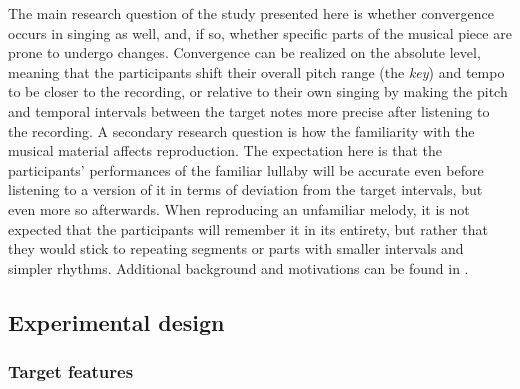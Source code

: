 The main research question of the study presented here is whether convergence occurs in singing as well, and, if so, whether specific parts of the musical piece are prone to undergo changes.
Convergence can be realized on the absolute level, meaning that the participants shift their overall pitch range (the \emph{key}) and tempo to be closer to the recording, or relative to their own singing by making the pitch and temporal intervals between the target notes more precise after listening to the recording.
A secondary research question is how the familiarity with the musical material affects reproduction.
The expectation here is that the participants' performances of the familiar lullaby will be accurate even before listening to a version of it in terms of deviation from the target intervals, but even more so afterwards.
When reproducing an unfamiliar melody, it is not expected that the participants will remember it in its entirety, but rather that they would stick to repeating segments or parts with smaller intervals and simpler rhythms.
Additional background and motivations can be found in \citet{Raveh2020SpeechProsody}.


\subsection{Experimental design}
\label{subsec:design_music}

\subsubsection{Target features}
\label{subsubsec:target_features_music}


